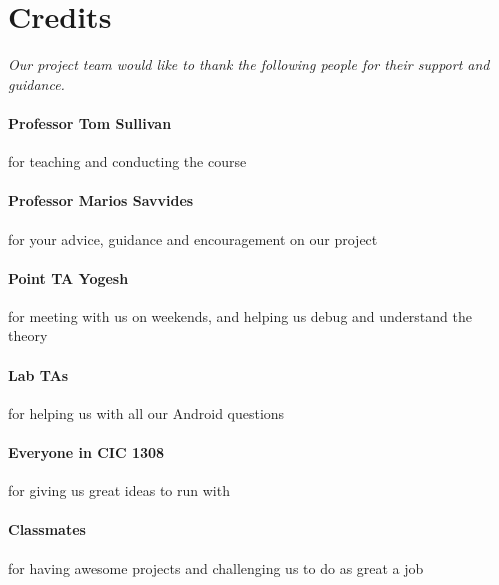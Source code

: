 \section{Credits}
{\em
	Our project team would like to thank the following people for their support and guidance.
	
	\paragraph{Professor Tom Sullivan} for teaching and conducting the course
	\paragraph{Professor Marios Savvides} for your advice, guidance and encouragement on our project
	\paragraph{Point TA Yogesh} for meeting with us on weekends, and helping us debug and understand the theory
	\paragraph{Lab TAs} for helping us with all our Android questions
	\paragraph{Everyone in CIC 1308} for giving us great ideas to run with
	\paragraph{Classmates} for having awesome projects and challenging us to do as great a job
}
